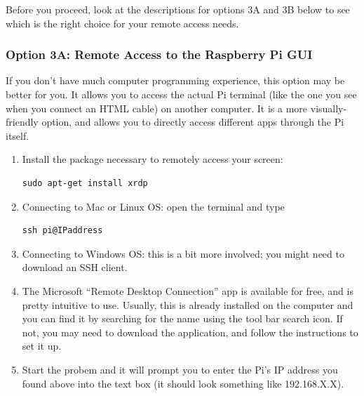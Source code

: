 \documentclass{article}\usepackage[]{graphicx}\usepackage[]{color}
\begin{document}
Before you proceed, look at the descriptions for options 3A and 3B below to see which is the right choice for your remote access needs.

\subsubsection{Option 3A: Remote Access to the Raspberry Pi GUI}

If you don't have much computer programming experience, this option may be better for you.  It allows you to access the actual Pi terminal (like the one you see when you connect an HTML cable) on another computer.  It is a more visually-friendly option, and allows you to directly access different apps through the Pi itself.

\begin{enumerate}

\item Install the package necessary to remotely access your screen: 

\begin{lstlisting}
sudo apt-get install xrdp
\end{lstlisting}

\item Connecting to Mac or Linux OS: open the terminal and type

\begin{lstlisting}
ssh pi@IPaddress
\end{lstlisting}

\item Connecting to Windows OS: this is a bit more involved; you might need to download an SSH client. 

\item The Microsoft ``Remote Desktop Connection'' app is available for free, and is pretty intuitive to use. Usually, this is already installed on the computer and you can find it by searching for the name using the tool bar search icon. If not, you may need to download the application, and follow the instructions to set it up. 

\item Start the probem and it will prompt you to enter the Pi's IP  address you found above into the text box (it should look something like 192.168.X.X).


\end{enumerate}
\end{document}
